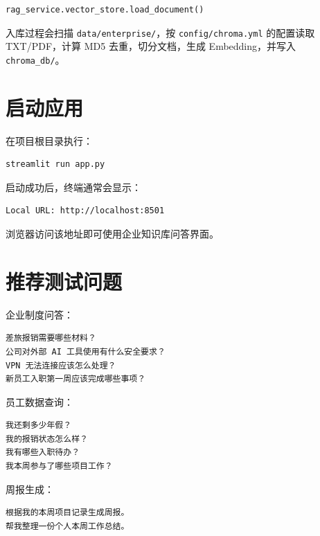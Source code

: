 \documentclass[UTF8,zihao=-4]{ctexart}
\begin{document}
\begin{Verbatim}[breaklines=true,breakanywhere=true,fontsize=\small]
rag_service.vector_store.load_document()
\end{Verbatim}

入库过程会扫描 \texttt{data/enterprise/}，按 \texttt{config/chroma.yml} 的配置读取 TXT/PDF，计算 MD5 去重，切分文档，生成 Embedding，并写入 \texttt{chroma\_db/}。

\section{启动应用}

在项目根目录执行：

\begin{Verbatim}[breaklines=true,breakanywhere=true,fontsize=\small]
streamlit run app.py
\end{Verbatim}

启动成功后，终端通常会显示：

\begin{Verbatim}[breaklines=true,breakanywhere=true,fontsize=\small]
Local URL: http://localhost:8501
\end{Verbatim}

浏览器访问该地址即可使用企业知识库问答界面。

\section{推荐测试问题}

企业制度问答：

\begin{Verbatim}[breaklines=true,breakanywhere=true,fontsize=\small]
差旅报销需要哪些材料？
公司对外部 AI 工具使用有什么安全要求？
VPN 无法连接应该怎么处理？
新员工入职第一周应该完成哪些事项？
\end{Verbatim}

员工数据查询：

\begin{Verbatim}[breaklines=true,breakanywhere=true,fontsize=\small]
我还剩多少年假？
我的报销状态怎么样？
我有哪些入职待办？
我本周参与了哪些项目工作？
\end{Verbatim}

周报生成：

\begin{Verbatim}[breaklines=true,breakanywhere=true,fontsize=\small]
根据我的本周项目记录生成周报。
帮我整理一份个人本周工作总结。
\end{Verbatim}
\end{document}
